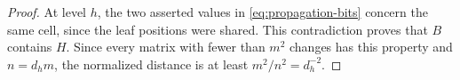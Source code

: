 \begin{proof}
At level $h$, the two asserted values in
\eqref{eq:propagation-bits} concern the same cell, since the leaf
positions were shared.  This contradiction proves that $B$ contains
$H$.  Since every matrix with fewer than $m^2$ changes has this
property and $n=d_hm$, the normalized distance is at least
$m^2/n^2=d_h^{-2}$.
\end{proof}
